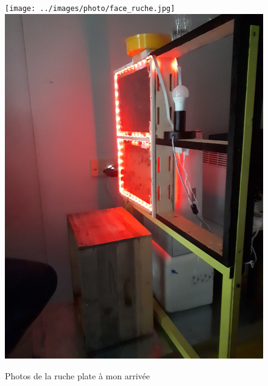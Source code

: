 \documentclass[11pt,french,a4paper]{report}
\begin{document}
\begin{figure}[!h]
\centering
\texttt{[image: ../images/photo/face\_ruche.jpg]}
\includegraphics[scale=0.05,angle=270]{../images/photo/cote_ruche.jpg} \\
\caption{Photos de la ruche plate à mon arrivée}
\label{photo_rucher}
\end{figure}
\end{document}
